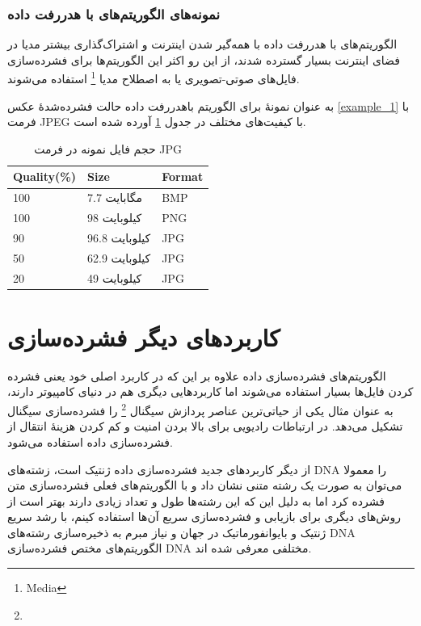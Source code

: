 \subsubsection{نمونه‌های الگوریتم‌های با هدررفت داده}
الگوریتم‌های با هدررفت داده با همه‌گیر شدن اینترنت و اشتراک‌گذاری 
بیشتر مدیا در فضای اینترنت بسیار گسترده شدند، از این رو اکثر این الگوریتم‌ها برای فشرده‌سازی فایل‌های صوتی-تصویری یا به اصطلاح 
مدیا  \footnote{Media}
استفاده می‌شوند. 

به عنوان نمونهٔ برای الگوریتم باهدررفت داده 
حالت فشرده‌شدهٔ عکس 
\ref{example_1}
با فرمت JPEG 
با کیفیت‌های مختلف در جدول 
\ref{compare_2}
آورده شده است.

\begin{table}[h]
	\centering
	\caption{حجم فایل نمونه در فرمت JPG}
	\label{compare_2}
	\begin{tabular}{@{}lll@{}}
	\toprule
	Quality(\%) & Size & Format \\ \midrule
	100 & 7.7 مگابایت & BMP \\
	100 & 98 کیلوبایت & PNG \\
	90 & 96.8 کیلوبایت & JPG \\
	50 & 62.9 کیلوبایت & JPG \\
	20 & 49  کیلوبایت& JPG \\ \bottomrule
	\end{tabular}
	\end{table}


\section{کاربردهای دیگر فشرده‌سازی}
الگوریتم‌های فشرده‌سازی داده علاوه بر این که در کاربرد اصلی خود یعنی فشرده کردن فایل‌ها بسیار استفاده می‌شوند اما کاربردهایی دیگری هم در دنیای
کامپیوتر دارند، به عنوان مثال یکی از حیاتی‌ترین عناصر پردازش سیگنال 
\footnote{} 
را فشرده‌سازی سیگنال تشکیل می‌دهد. در ارتباطات رادیویی برای بالا بردن امنیت و کم کردن هزینهٔ انتقال از فشرده‌سازی داده استفاده می‌شود. 

از دیگر کاربردهای جدید فشرده‌سازی داده ژنتیک است، زشته‌های DNA را معمولا می‌توان به صورت
یک رشته متنی نشان داد و با الگوریتم‌های فعلی فشرده‌سازی متن فشرده کرد اما به دلیل این که این رشته‌ها طول و تعداد زیادی دارند
بهتر است از روش‌های دیگری برای بازیابی و فشرده‌سازی سریع آن‌ها استفاده کینم، با رشد سریع ژنتیک و بایوانفورماتیک در جهان و نیاز
مبرم به ذخیره‌سازی رشته‌های DNA 
الگوریتم‌های مختص فشرده‌سازی DNA مختلفی معرفی شده اند\cite{dna}. 